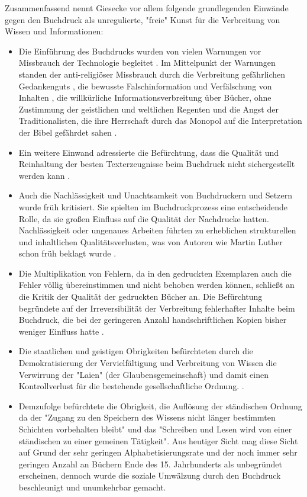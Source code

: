 Zusammenfassend nennt Giesecke vor allem folgende grundlegenden Einwände gegen den Buchdruck als unregulierte, "freie" Kunst \cite{giesecke_1991_buchdruck} für die Verbreitung von Wissen und Informationen:
\begin{itemize}
\item Die Einführung des Buchdrucks wurden von vielen Warnungen vor Missbrauch der Technologie begleitet \cite{lange2008medienwettbewerb}. Im Mittelpunkt der Warnungen standen der anti-religiöser Missbrauch durch die Verbreitung gefährlichen Gedankenguts \cite{kruse2003multimedia}, die bewusste Falschinformation und Verfälschung von Inhalten \cite{sprachgeschichte_1998_besch}, die willkürliche Informationsverbreitung über Bücher, ohne Zustimmung der geistlichen und weltlichen Regenten \cite{rother_2002_siebenbuergen} und die Angst der Traditionalisten, die ihre Herrschaft durch das Monopol auf die Interpretation der Bibel gefährdet sahen \cite{lange2008medienwettbewerb}.
\item Ein weitere Einwand adressierte die Befürchtung, dass die Qualität und Reinhaltung der besten Texterzeugnisse beim Buchdruck nicht sichergestellt werden kann \cite{giesecke_1991_buchdruck}.
\item Auch die Nachlässigkeit und Unachtsamkeit von Buchdruckern und Setzern wurde früh kritisiert. Sie spielten im Buchdruckprozess eine entscheidende Rolle, da sie großen Einfluss auf die Qualität der Nachdrucke hatten. Nachlässigkeit oder ungenaues Arbeiten führten zu erheblichen strukturellen und inhaltlichen Qualitätsverlusten, was von Autoren wie Martin Luther schon früh beklagt wurde \cite{sprachgeschichte_1998_besch} \cite{stober_2014_pressegeschichte} \cite{luther_1876}.
\item Die Multiplikation von Fehlern, da in den gedruckten Exemplaren auch die Fehler völlig übereinstimmen und nicht behoben werden können, schließt an die Kritik der Qualität der gedruckten Bücher an. Die Befürchtung begründete auf der Irreversibilität der Verbreitung fehlerhafter Inhalte beim Buchdruck, die bei der geringeren Anzahl handschriftlichen Kopien bisher weniger Einfluss hatte \cite{kittler_2004}.
\item Die staatlichen und geistigen Obrigkeiten befürchteten durch die Demokratisierung der Vervielfältigung und Verbreitung von Wissen die Verwirrung der "Laien" (der Glaubensgemeinschaft) und damit einen Kontrollverlust für die bestehende gesellschaftliche Ordnung. \cite{giesecke_1991_buchdruck}.
\item Demzufolge befürchtete die Obrigkeit, die Auflösung der ständischen Ordnung da der "Zugang zu den Speichern des Wissens nicht länger bestimmten Schichten vorbehalten bleibt" und das "Schreiben und Lesen wird von einer ständischen zu einer gemeinen Tätigkeit". Aus heutiger Sicht mag diese Sicht auf Grund der sehr geringen Alphabetisierungsrate und der noch immer sehr geringen Anzahl an Büchern Ende des 15. Jahrhunderts als unbegründet erscheinen, dennoch wurde die soziale Umwälzung durch den Buchdruck beschleunigt und unumkehrbar gemacht. \cite{giesecke_1991_buchdruck}

\end{itemize}
